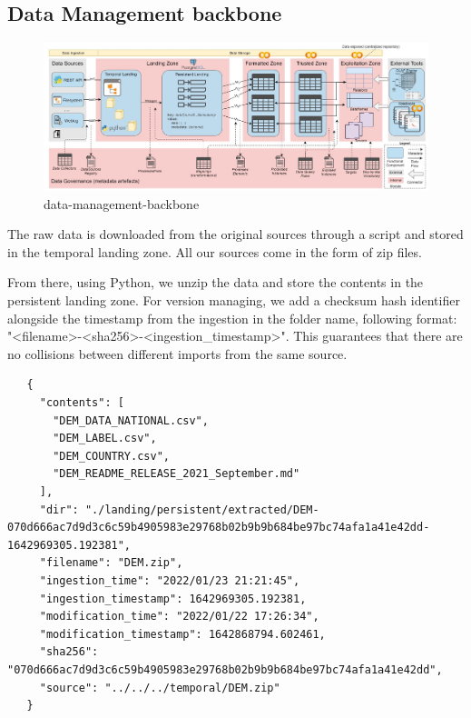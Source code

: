 

\begin{landscape}
\section{Data Management backbone}
\begin{figure}[H]
    \includegraphics[width=\linewidth]{document/figures/data-management-backbone.jpg}
    \caption{data-management-backbone}
\end{figure}
\end{landscape}

The raw data is downloaded from the original sources through a script and stored in the temporal
landing zone. All our sources come in the form of zip files.

From there, using Python, we unzip the data and store the contents in the persistent landing zone.
For version managing, we add a checksum hash identifier alongside the timestamp from the ingestion in the folder name, following format: "<filename>-<sha256>-<ingestion\_timestamp>". This guarantees that there
are no collisions between different imports from the same source.

\begin{verbatim}
   {
     "contents": [
       "DEM_DATA_NATIONAL.csv",
       "DEM_LABEL.csv",
       "DEM_COUNTRY.csv",
       "DEM_README_RELEASE_2021_September.md"
     ],
     "dir": "./landing/persistent/extracted/DEM-070d666ac7d9d3c6c59b4905983e29768b02b9b9b684be97bc74afa1a41e42dd-1642969305.192381",
     "filename": "DEM.zip",
     "ingestion_time": "2022/01/23 21:21:45",
     "ingestion_timestamp": 1642969305.192381,
     "modification_time": "2022/01/22 17:26:34",
     "modification_timestamp": 1642868794.602461,
     "sha256": "070d666ac7d9d3c6c59b4905983e29768b02b9b9b684be97bc74afa1a41e42dd",
     "source": "../../../temporal/DEM.zip"
   }
\end{verbatim}

